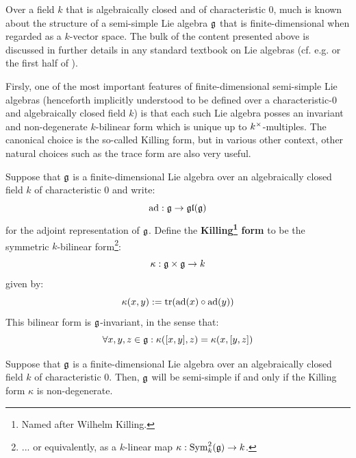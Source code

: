             Over a field $k$ that is algebraically closed and of characteristic $0$, much is known about the structure of a semi-simple Lie algebra $\mathfrak{g}$ that is finite-dimensional when regarded as a $k$-vector space. The bulk of the content presented above is discussed in further details in any standard textbook on Lie algebras (cf. e.g. \cite{humphreys_lie_algebras} or the first half of \cite{carter_affine_lie_algebras}).

            Firsly, one of the most important features of finite-dimensional semi-simple Lie algebras (henceforth implicitly understood to be defined over a characteristic-$0$ and algebraically closed field $k$) is that each such Lie algebra posses an invariant and non-degenerate $k$-bilinear form which is unique up to $k^{\x}$-multiples. The canonical choice is the so-called Killing form, but in various other context, other natural choices such as the trace form are also very useful. 
            \begin{lemma} \label{lemma: killing_form}
                Suppose that $\mathfrak{g}$ is a finite-dimensional Lie algebra over an algebraically closed field $k$ of characteristic $0$ and write:
                    $$\mathrm{ad}: \mathfrak{g} \to \mathfrak{gl}(\mathfrak{g})$$
                for the adjoint representation of $\mathfrak{g}$. Define the \textbf{Killing\footnote{Named after Wilhelm Killing.} form} to be the symmetric $k$-bilinear form\footnote{... or equivalently, as a $k$-linear map $\kappa: \mathrm{Sym}^2_k(\mathfrak{g}) \to k$.}:
                    $$\kappa: \g \x \g \to k$$
                given by:
                    $$\kappa(x, y) := \operatorname{tr}(\mathrm{ad}(x) \circ \mathrm{ad}(y))$$
                This bilinear form is $\mathfrak{g}$-invariant, in the sense that:
                    $$\forall x, y, z \in \mathfrak{g}: \kappa([x, y], z) = \kappa(x, [y, z])$$
            \end{lemma}
            \begin{proposition} \label{prop: cartan_semi_simplicity_criterion}
                Suppose that $\mathfrak{g}$ is a finite-dimensional Lie algebra over an algebraically closed field $k$ of characteristic $0$. Then, $\mathfrak{g}$ will be semi-simple if and only if the Killing form $\kappa$ is non-degenerate. 
            \end{proposition}
